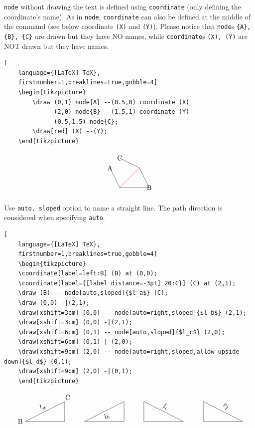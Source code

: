\documentclass[lualatex]{jlreq}
\begin{document}
\verb|node| without drawing the text is defined using \verb|coordinate| (only defining the coordinate's name). As in \verb|node|, \verb|coordinate| can also be defined at the middle of the command (see below coordinate \verb|(X)| and \verb|(Y)|). Please notice that \verb|node|s \verb|{A}, {B}, {C}| are drawn but they have NO names, while \verb|coordinate|s \verb|(X), (Y)| are NOT drawn but they have names.
\begin{lstlisting}[
    language={[LaTeX] TeX},
    firstnumber=1,breaklines=true,gobble=4]
    \begin{tikzpicture}
        \draw (0,1) node{A} --(0.5,0) coordinate (X)
            --(2,0) node{B} --(1.5,1) coordinate (Y)
            --(0.5,1.5) node{C};
        \draw[red] (X) --(Y);
    \end{tikzpicture}
\end{lstlisting}
\[
    \begin{tikzpicture}
        \draw (0,1) node{A} --(0.5,0) coordinate (X)
            --(2,0) node{B} --(1.5,1) coordinate (Y)
            --(0.5,1.5) node{C};
        \draw[red] (X) --(Y);
    \end{tikzpicture}
\]

Use \verb|auto, sloped| option to name a straight line. The path direction is considered when specifying \verb|auto|.
\begin{lstlisting}[
    language={[LaTeX] TeX},
    firstnumber=1,breaklines=true,gobble=4]
    \begin{tikzpicture}
    \coordinate[label=left:B] (B) at (0,0);
    \coordinate[label={[label distance=-3pt] 20:C}] (C) at (2,1);
    \draw (B) -- node[auto,sloped]{$l_a$} (C);
    \draw (0,0) -|(2,1);
    \draw[xshift=3cm] (0,0) -- node[auto=right,sloped]{$l_b$} (2,1);
    \draw[xshift=3cm] (0,0) -|(2,1);
    \draw[xshift=6cm] (0,1) -- node[auto,sloped]{$l_c$} (2,0);
    \draw[xshift=6cm] (0,1) |-(2,0);
    \draw[xshift=9cm] (2,0) -- node[auto=right,sloped,allow upside down]{$l_d$} (0,1);
    \draw[xshift=9cm] (2,0) -|(0,1);
    \end{tikzpicture}
\end{lstlisting}
\[
    \begin{tikzpicture}
    \coordinate[label=left:B] (B) at (0,0);
    \coordinate[label={[label distance=-3pt] 20:C}] (C) at (2,1);
    \draw (B) -- node[auto,sloped]{$l_a$} (C);
    \draw (0,0) -|(2,1);
    \draw[xshift=3cm] (0,0) -- node[auto=right,sloped]{$l_b$} (2,1);
    \draw[xshift=3cm] (0,0) -|(2,1);
    \draw[xshift=6cm] (0,1) -- node[auto,sloped]{$l_c$} (2,0);
    \draw[xshift=6cm] (0,1) |-(2,0);
    \draw[xshift=9cm] (2,0) -- node[auto=right,sloped,allow upside down]{$l_d$} (0,1);
    \draw[xshift=9cm] (2,0) -|(0,1);
    \end{tikzpicture}
\]
\end{document}
